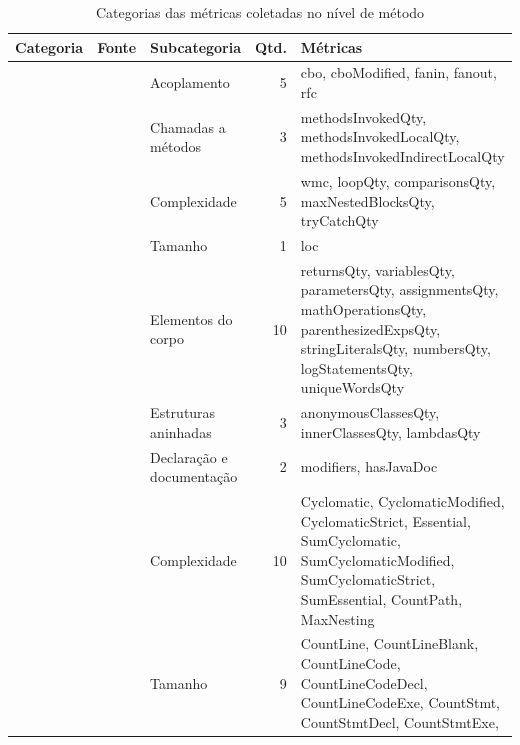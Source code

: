 \begin{table}[htbp]
    \centering
    \scriptsize
    \caption{Categorias das métricas coletadas no nível de método}
    \label{tab:met-categorias}
    \renewcommand{\arraystretch}{1.15}
    \begin{tabularx}{\textwidth}{@{}l l l r >{\raggedright\arraybackslash}X@{}}
        \toprule
        Categoria & Fonte & Subcategoria & Qtd. & Métricas \\
        \midrule
            & 
                & Acoplamento                & 5  & cbo, cboModified, fanin, fanout, rfc \\
            & & Chamadas a métodos           & 3  & methodsInvokedQty, methodsInvokedLocalQty, methodsInvokedIndirectLocalQty \\
            & & Complexidade                 & 5  & wmc, loopQty, comparisonsQty, maxNestedBlocksQty, tryCatchQty \\
            & & Tamanho                      & 1  & loc \\
            & & Elementos do corpo           & 10 & returnsQty, variablesQty, parametersQty, assignmentsQty,
                                                    mathOperationsQty, parenthesizedExpsQty, stringLiteralsQty,
                                                    numbersQty, logStatementsQty, uniqueWordsQty \\
            & & Estruturas aninhadas         & 3  & anonymousClassesQty, innerClassesQty, lambdasQty \\
            & & Declaração e documentação    & 2  & modifiers, hasJavaDoc \\
            \cmidrule(l){2-5}
            & 
                & Complexidade               & 10 & Cyclomatic, CyclomaticModified, CyclomaticStrict, Essential,
                                                    SumCyclomatic, SumCyclomaticModified, SumCyclomaticStrict,
                                                    SumEssential, CountPath, MaxNesting \\
            & & Tamanho                      & 9  & CountLine, CountLineBlank, CountLineCode, CountLineCodeDecl,
                                                    CountLineCodeExe, CountStmt, CountStmtDecl, CountStmtExe,

\end{tabularx}
\end{table}
